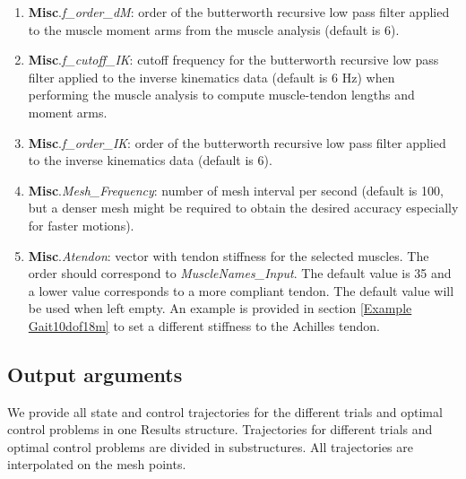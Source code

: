 \documentclass[a4paper,oneside,11pt]{article}
\begin{document}
\begin{enumerate}
	\item \textbf{Misc}.\textit{f_order_dM}: order of the butterworth recursive low pass filter applied to the muscle moment arms from the muscle analysis (default is 6).

	\item \textbf{Misc}.\textit{f_cutoff_IK}: cutoff frequency for the butterworth recursive low pass filter applied to the inverse kinematics data (default is 6 Hz) when performing the muscle analysis to compute muscle-tendon lengths and moment arms.
	
	\item \textbf{Misc}.\textit{f_order_IK}: order of the butterworth recursive low pass filter applied to the inverse kinematics data (default is 6).

	\item \textbf{Misc}.\textit{Mesh_Frequency}: number of mesh interval per second (default is 100, but a denser mesh might be required to obtain the desired accuracy especially for faster motions).
	
	\item \textbf{Misc}.\textit{Atendon}: vector with tendon stiffness for the selected muscles. The order should correspond to \textit{MuscleNames_Input}. The default value is 35 and a lower value corresponds to a more compliant tendon. The default value will be used when left empty. An example is provided in section \ref{Example Gait10dof18m} to set a different stiffness to the Achilles tendon.

\end{enumerate}

\subsection{Output arguments}
We provide all state and control trajectories for the different trials and optimal control problems in one Results structure. Trajectories for different trials and optimal control problems are divided in substructures. All trajectories are interpolated on the mesh points.
\end{document}
